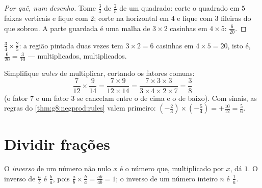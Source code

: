 \begin{proof}[Por quê, num desenho]
Tome $\frac34$ de $\frac25$ de um quadrado: corte o quadrado em $5$
faixas verticais e fique com $2$; corte na horizontal em $4$ e fique
com $3$ fileiras do que sobrou. A parte guardada é uma malha de
$3 \times 2$ casinhas em $4 \times 5$:  $\frac{6}{20}$.
\end{proof}

\begin{omfigure}

{\small $\frac34 \times \frac25$: a região pintada duas vezes tem
$3 \times 2 = 6$ casinhas em $4 \times 5 = 20$, isto é,
$\frac{6}{20} = \frac{3}{10}$ ---  multiplicados,
 multiplicados.}
\end{omfigure}

\begin{example}\label{ex:g8:fractions:mult}
Simplifique \emph{antes} de multiplicar, cortando os fatores comuns:
\[
\frac{7}{12} \times \frac{9}{14}
= \frac{7 \times 9}{12 \times 14}
= \frac{7 \times 3 \times 3}{3 \times 4 \times 2 \times 7}
= \frac{3}{8}
\]
(o fator $7$ e um fator $3$ se cancelam entre o de cima e o de baixo).
Com sinais, as regras do \cref{thm:g8:negprod:rules} valem primeiro:
$\left(-\frac23\right) \times \left(-\frac{5}{4}\right) =
+\frac{10}{12} = \frac56$.
\end{example}

\section{Dividir frações}

\begin{definition}[Inverso]\label{def:g8:fractions:inverse}
O \emph{inverso} de um número não nulo $x$ é o número
que, multiplicado por $x$, dá $1$. O inverso de $\frac ab$ é
$\frac ba$, pois $\frac ab \times \frac ba = \frac{ab}{ab} = 1$; o
inverso de um número inteiro $n$ é $\frac1n$.
\end{definition}

